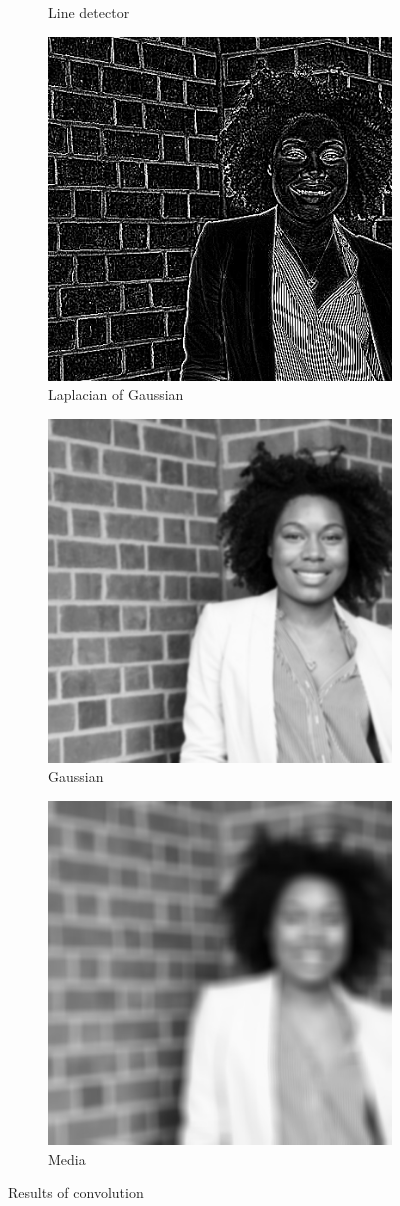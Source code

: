 \begin{figure}[h!]
\begin{subfigure}{0.3\textwidth}
  \caption{Line detector}
\end{subfigure}%
\begin{subfigure}{0.3\textwidth}
  \centering
  \includegraphics[width=0.9\linewidth]{output/laplasOfGaussi.jpg}
  \caption{Laplacian of Gaussian}
\end{subfigure}
\begin{subfigure}{0.5\textwidth}
  \centering
  \includegraphics[width=0.5\linewidth]{output/gaussian.jpg}
  \caption{Gaussian}
\end{subfigure}%
\begin{subfigure}{0.5\textwidth}
  \centering
  \includegraphics[width=0.5\linewidth]{output/media.jpg}
  \caption{Media}
\end{subfigure}
 \caption{Results of convolution}
\label{fig:conv-results}
\end{figure}

